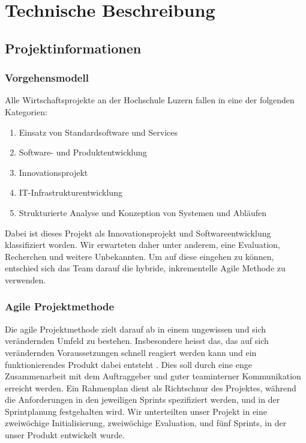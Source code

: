 \documentclass[a4paper]{scrreprt}
\begin{document}
\chapter{Technische Beschreibung}

\section{Projektinformationen}

\subsection{Vorgehensmodell}

Alle Wirtschaftsprojekte an der Hochschule Luzern fallen in eine der folgenden Kategorien:

\begin{enumerate}
	\item Einsatz von Standardsoftware und Services
	\item Software- und Produktentwicklung
	\item Innovationsprojekt
	\item IT-Infrastrukturentwicklung
	\item Strukturierte Analyse und Konzeption von Systemen und Abläufen
\end{enumerate}

Dabei ist dieses Projekt als Innovationsprojekt und Softwareentwicklung klassifiziert worden. Wir erwarteten daher unter anderem, eine Evaluation, Recherchen und weitere Unbekannten. Um auf diese eingehen zu können, entschied sich das Team darauf die hybride, inkrementelle Agile Methode zu verwenden.

\subsection{Agile Projektmethode}

Die agile Projektmethode zielt darauf ab in einem ungewissen und sich verändernden Umfeld zu bestehen. Insbesondere heisst das, das auf sich verändernden Voraussetzungen schnell reagiert werden kann und ein funktionierendes Produkt dabei entsteht \parencite{AgileAlliance2015}. Dies soll durch eine enge Zusammenarbeit mit dem Auftraggeber und guter teaminterner Kommunikation erreicht werden.
\bigbreak
Ein Rahmenplan dient als Richtschnur des Projektes, während die Anforderungen in den jeweiligen Sprints spezifiziert werden, und in der Sprintplanung festgehalten wird. Wir unterteilten unser Projekt in eine zweiwöchige Initialisierung, zweiwöchige Evaluation, und fünf Sprints, in der unser Produkt entwickelt wurde.
\end{document}
